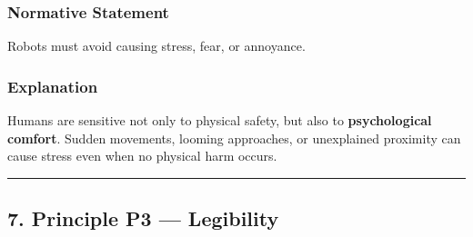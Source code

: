\documentclass[utf8]{frontiers_suppmat} %
\newenvironment{Shaded}{\begin{shaded}}{\end{shaded}}
\begin{document}
\subsubsection{Normative Statement}\label{normative-statement-2}

Robots must avoid causing stress, fear, or annoyance.

\subsubsection{Explanation}\label{explanation-2}

Humans are sensitive not only to physical safety, but also to
\textbf{psychological comfort}. Sudden movements, looming approaches, or
unexplained proximity can cause stress even when no physical harm
occurs.

\begin{Shaded}
\begin{Highlighting}[]
\KeywordTok{:}
\KeywordTok{:}
\KeywordTok{:}
\KeywordTok{: }\CharTok{\textgreater{}}
\KeywordTok{:}
\AttributeTok{  }\KeywordTok{:}
\AttributeTok{    }\KeywordTok{{-}}\AttributeTok{ }
\AttributeTok{    }\KeywordTok{{-}}\AttributeTok{ }
\AttributeTok{  }\KeywordTok{:}
\AttributeTok{    }\KeywordTok{{-}}\AttributeTok{ }
\AttributeTok{    }\KeywordTok{{-}}\AttributeTok{ }
\end{Highlighting}
\end{Shaded}

\begin{center}\rule{0.5\linewidth}{0.5pt}\end{center}

\subsection{7. Principle P3 ---
Legibility}\label{principle-p3-legibility}
\end{document}
